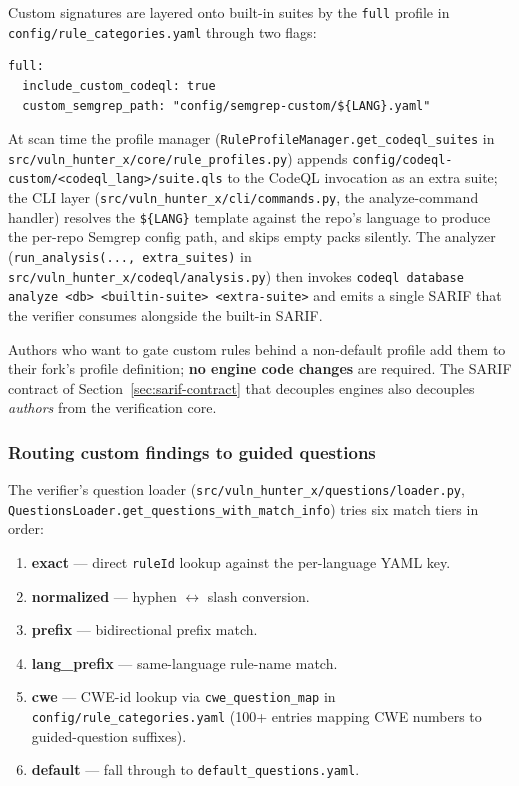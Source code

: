 \documentclass[11pt,a4paper]{article}
\begin{document}
Custom signatures are layered onto built-in suites by the \texttt{full}
profile in \texttt{config/rule\_categories.yaml} through two flags:

\begin{lstlisting}[language=yamlex]
full:
  include_custom_codeql: true
  custom_semgrep_path: "config/semgrep-custom/${LANG}.yaml"
\end{lstlisting}

At scan time the profile manager
(\texttt{RuleProfileManager.get\_codeql\_suites} in
\texttt{src/vuln\_hunter\_x/core/rule\_profiles.py}) appends
\texttt{config/codeql-custom/<codeql\_lang>/suite.qls} to the CodeQL
invocation as an extra suite; the CLI layer
(\texttt{src/vuln\_hunter\_x/cli/commands.py}, the analyze-command
handler) resolves the \verb|${LANG}| template against the repo's
language to produce the per-repo Semgrep config path, and skips empty
packs silently. The analyzer
(\texttt{run\_analysis(..., extra\_suites)} in
\texttt{src/vuln\_hunter\_x/codeql/analysis.py}) then invokes
\texttt{codeql database analyze <db> <builtin-suite> <extra-suite>} and
emits a single SARIF that the verifier consumes alongside the built-in
SARIF.

Authors who want to gate custom rules behind a non-default profile add
them to their fork's profile definition; \textbf{no engine code
changes} are required. The SARIF contract of
Section~\ref{sec:sarif-contract} that decouples engines also decouples
\emph{authors} from the verification core.

\subsubsection{Routing custom findings to guided questions}
\label{sec:routing}

The verifier's question loader
(\texttt{src/vuln\_hunter\_x/questions/loader.py},
\texttt{QuestionsLoader.get\_questions\_with\_match\_info}) tries six
match tiers in order:

\begin{enumerate}[leftmargin=*]
\item \textbf{exact} --- direct \texttt{ruleId} lookup against the
  per-language YAML key.
\item \textbf{normalized} --- hyphen $\leftrightarrow$ slash conversion.
\item \textbf{prefix} --- bidirectional prefix match.
\item \textbf{lang\_prefix} --- same-language rule-name match.
\item \textbf{cwe} --- CWE-id lookup via
  \texttt{cwe\_question\_map} in \texttt{config/rule\_categories.yaml}
  (100+ entries mapping CWE numbers to guided-question suffixes).
\item \textbf{default} --- fall through to
  \texttt{default\_questions.yaml}.
\end{enumerate}
\end{document}
